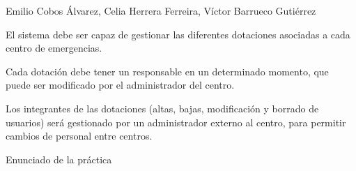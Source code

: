 {Emilio Cobos Álvarez, Celia Herrera Ferreira, Víctor Barrueco Gutiérrez}
{El sistema debe ser capaz de gestionar las diferentes dotaciones asociadas a cada centro de emergencias. \par
Cada dotación debe tener un responsable en un determinado momento, que puede ser modificado por el administrador del centro. \par
Los integrantes de las dotaciones (altas, bajas, modificación y borrado de usuarios) será gestionado por un administrador externo al centro, para permitir cambios de personal entre centros.}
{}
{Enunciado de la práctica}

